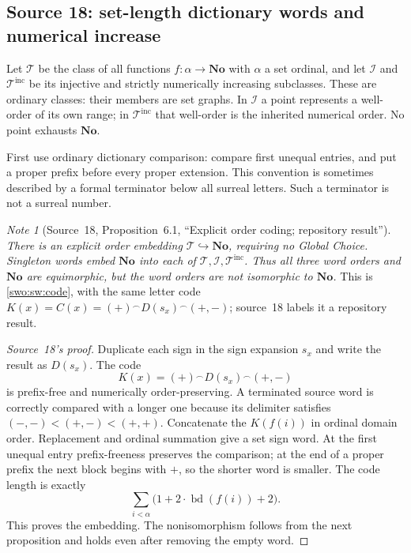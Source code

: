 \documentclass[11pt]{article}
\theoremstyle{definition}
\theoremstyle{remark}
\newtheorem{note}[note]{Note}
\newcommand{\No}{\mathbf{No}}
\newcommand{\Words}{\mathcal I}
\newcommand{\WordsAll}{\mathcal T}
\newcommand{\bd}{\operatorname{bd}}
\newcommand{\emb}{\hookrightarrow}
\newcommand{\cat}{\mathbin{{}^\frown}}
\newcommand{\WordsInc}{\mathcal T^{\mathrm{inc}}}
\begin{document}
\subsection{Source 18: set-length dictionary words and numerical increase}
\label{swo:sh:sec:dictionary-words}

Let $\WordsAll$ be the class of all functions $f:\alpha\to\No$
with $\alpha$ a set ordinal, and let $\Words$ and $\WordsInc$
be its injective and strictly numerically increasing subclasses. These
are ordinary classes: their members are set graphs. In $\Words$ a
point represents a well-order of its own range; in $\WordsInc$ that
well-order is the inherited numerical order. No point exhausts $\No$.

First use ordinary dictionary comparison: compare first unequal
entries, and put a proper prefix before every proper extension. This
convention is sometimes described by a formal terminator below all
surreal letters. Such a terminator is not a surreal number.

\begin{note}[Source~18, Proposition~6.1, ``Explicit order coding; repository result'']\label{swo:sh:prop:dictionary-code}
\emph{
There is an explicit order embedding $\WordsAll\emb\No$, requiring
no Global Choice. Singleton words embed $\No$ into each of
$\WordsAll,\Words,\WordsInc$. Thus all three word orders and
$\No$ are equimorphic, but the word orders are not isomorphic to
$\No$.} This is \cref{swo:sw:code}, with the same letter code
$K(x)=C(x)=(+)\cat D(s_x)\cat(+,-)$; source~18 labels it a repository result.
\end{note}
\begin{proof}[Source~18's proof]
Duplicate each sign in the sign expansion $s_x$ and write the result
as $D(s_x)$. The code
\[
 K(x)=(+)\cat D(s_x)\cat(+,-)
\]
is prefix-free and numerically order-preserving. A terminated source
word is correctly compared with a longer one because its delimiter
satisfies $(-,-)<(+,-)<(+,+)$. Concatenate the $K(f(i))$ in ordinal
domain order. Replacement and ordinal summation give a set sign word.
At the first unequal entry prefix-freeness preserves the comparison;
at the end of a proper prefix the next block begins with $+$, so the
shorter word is smaller. The code length is exactly
\[
 \sum_{i<\alpha}\bigl(1+2\cdot\bd(f(i))+2\bigr).
\]
This proves the embedding. The nonisomorphism follows from the
next proposition and holds even after removing the empty word.
\end{proof}
\end{document}
